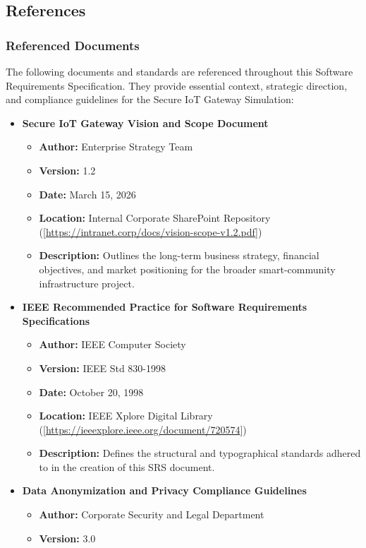 \documentclass[12pt,letterpaper]{article}
\begin{document}
\subsection{References}
\subsubsection{Referenced Documents}
The following documents and standards are referenced throughout this Software Requirements Specification. They provide essential context, strategic direction, and compliance guidelines for the Secure IoT Gateway Simulation:\par
\begin{itemize}
\item \textbf{Secure IoT Gateway Vision and Scope Document}
\begin{itemize}
\item \textbf{Author:} Enterprise Strategy Team
\item \textbf{Version:} 1.2
\item \textbf{Date:} March 15, 2026
\item \textbf{Location:} Internal Corporate SharePoint Repository ([\url{https://intranet.corp/docs/vision-scope-v1.2.pdf}])
\item \textbf{Description:} Outlines the long-term business strategy, financial objectives, and market positioning for the broader smart-community infrastructure project.
\end{itemize}
\item \textbf{IEEE Recommended Practice for Software Requirements Specifications}
\begin{itemize}
\item \textbf{Author:} IEEE Computer Society
\item \textbf{Version:} IEEE Std 830-1998
\item \textbf{Date:} October 20, 1998
\item \textbf{Location:} IEEE Xplore Digital Library ([\url{https://ieeexplore.ieee.org/document/720574}])
\item \textbf{Description:} Defines the structural and typographical standards adhered to in the creation of this SRS document.
\end{itemize}
\item \textbf{Data Anonymization and Privacy Compliance Guidelines}
\begin{itemize}
\item \textbf{Author:} Corporate Security and Legal Department
\item \textbf{Version:} 3.0

\end{itemize}
\end{itemize}
\end{document}
